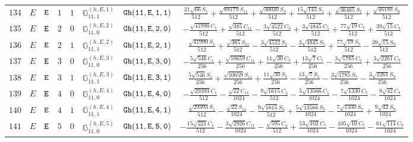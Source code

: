 \documentclass[fleqn,8pt]{jsarticle}
\begin{document}
\begin{table}[ht!]
\begin{center}
\begin{tabular}{cccccccc}
$ 134 $ & $ E $ & $ {\tt E} $ & $ 1 $ & $ 1 $ & $ \mathbb{G}_{11,1}^{(h,E,1)} $ & $ {\tt Gh(11,E,1,1)} $ & $ \frac{21 \sqrt{66} S_{1}}{512} + \frac{\sqrt{88179} S_{11}}{512} + \frac{\sqrt{30030} S_{3}}{512} + \frac{15 \sqrt{143} S_{5}}{512} + \frac{\sqrt{36465} S_{7}}{512} + \frac{\sqrt{46189} S_{9}}{512} $ \\
$ 135 $ & $ E $ & $ {\tt E} $ & $ 2 $ & $ 0 $ & $ \mathbb{G}_{11,0}^{(h,E,2)} $ & $ {\tt Gh(11,E,2,0)} $ & $ - \frac{\sqrt{41990} C_{1}}{512} + \frac{\sqrt{385} C_{11}}{512} - \frac{3 \sqrt{4522} C_{3}}{512} + \frac{3 \sqrt{4845} C_{5}}{512} + \frac{77 \sqrt{19} C_{7}}{512} + \frac{39 \sqrt{15} C_{9}}{512} $ \\
$ 136 $ & $ E $ & $ {\tt E} $ & $ 2 $ & $ 1 $ & $ \mathbb{G}_{11,1}^{(h,E,2)} $ & $ {\tt Gh(11,E,2,1)} $ & $ \frac{\sqrt{41990} S_{1}}{512} + \frac{\sqrt{385} S_{11}}{512} - \frac{3 \sqrt{4522} S_{3}}{512} - \frac{3 \sqrt{4845} S_{5}}{512} + \frac{77 \sqrt{19} S_{7}}{512} - \frac{39 \sqrt{15} S_{9}}{512} $ \\
$ 137 $ & $ E $ & $ {\tt E} $ & $ 3 $ & $ 0 $ & $ \mathbb{G}_{11,0}^{(h,E,3)} $ & $ {\tt Gh(11,E,3,0)} $ & $ - \frac{5 \sqrt{546} C_{1}}{256} + \frac{\sqrt{10659} C_{11}}{256} + \frac{11 \sqrt{30} C_{3}}{256} + \frac{13 \sqrt{7} C_{5}}{256} - \frac{3 \sqrt{1785} C_{7}}{256} + \frac{3 \sqrt{2261} C_{9}}{256} $ \\
$ 138 $ & $ E $ & $ {\tt E} $ & $ 3 $ & $ 1 $ & $ \mathbb{G}_{11,1}^{(h,E,3)} $ & $ {\tt Gh(11,E,3,1)} $ & $ \frac{5 \sqrt{546} S_{1}}{256} + \frac{\sqrt{10659} S_{11}}{256} + \frac{11 \sqrt{30} S_{3}}{256} - \frac{13 \sqrt{7} S_{5}}{256} - \frac{3 \sqrt{1785} S_{7}}{256} - \frac{3 \sqrt{2261} S_{9}}{256} $ \\
$ 139 $ & $ E $ & $ {\tt E} $ & $ 4 $ & $ 0 $ & $ \mathbb{G}_{11,0}^{(h,E,4)} $ & $ {\tt Gh(11,E,4,0)} $ & $ - \frac{\sqrt{29393} C_{1}}{512} - \frac{\sqrt{22} C_{11}}{1024} - \frac{9 \sqrt{1615} C_{3}}{512} - \frac{5 \sqrt{13566} C_{5}}{1024} - \frac{7 \sqrt{1330} C_{7}}{1024} - \frac{9 \sqrt{42} C_{9}}{1024} $ \\
$ 140 $ & $ E $ & $ {\tt E} $ & $ 4 $ & $ 1 $ & $ \mathbb{G}_{11,1}^{(h,E,4)} $ & $ {\tt Gh(11,E,4,1)} $ & $ \frac{\sqrt{29393} S_{1}}{512} - \frac{\sqrt{22} S_{11}}{1024} - \frac{9 \sqrt{1615} S_{3}}{512} + \frac{5 \sqrt{13566} S_{5}}{1024} - \frac{7 \sqrt{1330} S_{7}}{1024} + \frac{9 \sqrt{42} S_{9}}{1024} $ \\
$ 141 $ & $ E $ & $ {\tt E} $ & $ 5 $ & $ 0 $ & $ \mathbb{G}_{11,0}^{(h,E,5)} $ & $ {\tt Gh(11,E,5,0)} $ & $ - \frac{15 \sqrt{221} C_{1}}{512} - \frac{3 \sqrt{2926} C_{11}}{1024} - \frac{\sqrt{595} C_{3}}{512} + \frac{53 \sqrt{102} C_{5}}{1024} - \frac{105 \sqrt{10} C_{7}}{1024} - \frac{61 \sqrt{114} C_{9}}{1024} $ \\

\end{tabular}
\end{center}
\end{table}
\end{document}
